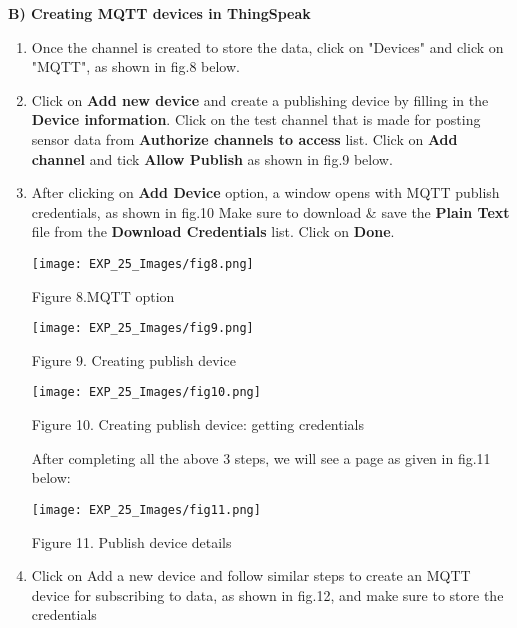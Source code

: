 \documentclass[12pt,a4paper]{article}
\begin{document}
\begin{justify}
\textbf{B)	Creating MQTT devices in ThingSpeak}\\
\vspace{-7mm}
\begin{enumerate}
\setlength\itemsep{-0.3em}
\item Once the channel is created to store the data, click on "Devices" and click on "MQTT", as shown in fig.8 below.
\item Click on \textbf{Add new device} and create a publishing device by filling in the \textbf{Device information}. Click on the test channel that is made for posting sensor data from \textbf{Authorize channels to access} list. Click on \textbf{Add channel} and tick \textbf{Allow Publish} as shown in fig.9 below.
\item After clicking on \textbf{Add Device} option, a window opens with MQTT publish credentials, as shown in fig.10 Make sure to download \& save the \textbf{Plain Text} file from the \textbf{Download Credentials} list. Click on \textbf{Done}.

\begin{center} 
\texttt{[image: EXP\_25\_Images/fig8.png]}
\end{center}
\begin{center} {Figure 8.MQTT option }\end{center}

\begin{center} 
\texttt{[image: EXP\_25\_Images/fig9.png]}
\end{center}
\begin{center} {Figure 9. Creating publish device }\end{center}

\begin{center} 
\texttt{[image: EXP\_25\_Images/fig10.png]}
\end{center}
\begin{center} {Figure 10. Creating publish device: getting credentials}\end{center}

After completing all the above 3 steps, we will see a page as given in fig.11 below:

\begin{center} 
\texttt{[image: EXP\_25\_Images/fig11.png]}
\end{center}
\begin{center} {Figure 11. Publish device details}\end{center}
\item Click on Add a new device and follow similar steps to create an MQTT device for subscribing to data, as shown in fig.12, and make sure to store the credentials


\end{enumerate}
\end{justify}
\end{document}
